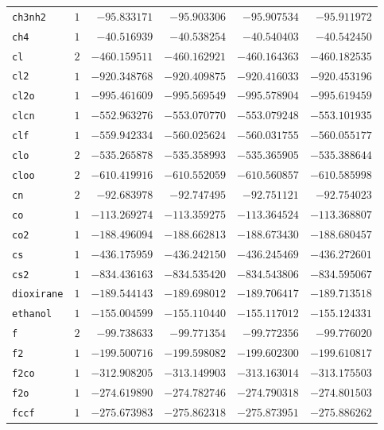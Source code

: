 {\begin{longtable}{@{}lrrrrr@{}}
    \texttt{ch3nh2} & $1$ & $-95.833171$ & $-95.903306$ & $-95.907534$ & $-95.911972$ \\
    \texttt{ch4} & $1$ & $-40.516939$ & $-40.538254$ & $-40.540403$ & $-40.542450$ \\
    \texttt{cl} & $2$ & $-460.159511$ & $-460.162921$ & $-460.164363$ & $-460.182535$ \\
    \texttt{cl2} & $1$ & $-920.348768$ & $-920.409875$ & $-920.416033$ & $-920.453196$ \\
    \texttt{cl2o} & $1$ & $-995.461609$ & $-995.569549$ & $-995.578904$ & $-995.619459$ \\
    \texttt{clcn} & $1$ & $-552.963276$ & $-553.070770$ & $-553.079248$ & $-553.101935$ \\
    \texttt{clf} & $1$ & $-559.942334$ & $-560.025624$ & $-560.031755$ & $-560.055177$ \\
    \texttt{clo} & $2$ & $-535.265878$ & $-535.358993$ & $-535.365905$ & $-535.388644$ \\
    \texttt{cloo} & $2$ & $-610.419916$ & $-610.552059$ & $-610.560857$ & $-610.585998$ \\
    \texttt{cn} & $2$ & $-92.683978$ & $-92.747495$ & $-92.751121$ & $-92.754023$ \\
    \texttt{co} & $1$ & $-113.269274$ & $-113.359275$ & $-113.364524$ & $-113.368807$ \\
    \texttt{co2} & $1$ & $-188.496094$ & $-188.662813$ & $-188.673430$ & $-188.680457$ \\
    \texttt{cs} & $1$ & $-436.175959$ & $-436.242150$ & $-436.245469$ & $-436.272601$ \\
    \texttt{cs2} & $1$ & $-834.436163$ & $-834.535420$ & $-834.543806$ & $-834.595067$ \\
    \texttt{dioxirane} & $1$ & $-189.544143$ & $-189.698012$ & $-189.706417$ & $-189.713518$ \\
    \texttt{ethanol} & $1$ & $-155.004599$ & $-155.110440$ & $-155.117012$ & $-155.124331$ \\
    \texttt{f} & $2$ & $-99.738633$ & $-99.771354$ & $-99.772356$ & $-99.776020$ \\
    \texttt{f2} & $1$ & $-199.500716$ & $-199.598082$ & $-199.602300$ & $-199.610817$ \\
    \texttt{f2co} & $1$ & $-312.908205$ & $-313.149903$ & $-313.163014$ & $-313.175503$ \\
    \texttt{f2o} & $1$ & $-274.619890$ & $-274.782746$ & $-274.790318$ & $-274.801503$ \\
    \texttt{fccf} & $1$ & $-275.673983$ & $-275.862318$ & $-275.873951$ & $-275.886262$ \\

\end{longtable}}
